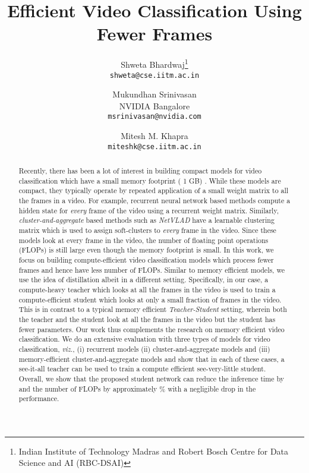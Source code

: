 \documentclass[10pt,twocolumn,letterpaper]{article}
\begin{document}
\title{Efficient Video Classification Using Fewer Frames}
\newcommand*\samethanks[1][\value{footnote}]{\footnotemark[#1]}
\author{Shweta Bhardwaj\thanks{Indian Institute of Technology Madras and Robert Bosch Centre for Data Science and AI (RBC-DSAI)}\\  {\tt\small shweta@cse.iitm.ac.in} 
        \and
        Mukundhan Srinivasan \\ \small{NVIDIA Bangalore} \\ {\tt\small msrinivasan@nvidia.com} \\
        \and
        Mitesh M. Khapra\samethanks\\  
        {\tt\small miteshk@cse.iitm.ac.in}
}





\maketitle


\begin{abstract}
Recently, there has been a lot of interest in building compact models for video classification which have a small memory footprint ( 1 GB) \cite{summary-paper}. While these models are compact, they typically operate by repeated application of a small weight matrix to all the frames in a video. For example, recurrent neural network based methods compute a hidden state for \textit{every} frame of the video using a recurrent weight matrix. Similarly, \textit{cluster-and-aggregate} based methods such as \textit{NetVLAD} have a learnable clustering matrix which is used to assign soft-clusters to \textit{every} frame in the video. Since these models look at every frame in the video, the number of floating point operations (FLOPs) is still large even though the memory footprint is small. In this work, we focus on building compute-efficient video classification models which process fewer frames and hence have less number of FLOPs. Similar to memory efficient models, we use the idea of distillation albeit in a different setting. Specifically, in our case, a compute-heavy teacher which looks at all the frames in the video is used to train a compute-efficient student which looks at only a small fraction of frames in the video. This is in contrast to a typical memory efficient \textit{Teacher-Student} setting, wherein both the teacher and the student look at all the frames in the video but the student has fewer parameters. Our work thus complements the research on memory efficient video classification. We do an extensive evaluation with three types of models for video classification, \textit{viz.}, (i) recurrent models (ii) cluster-and-aggregate models and (iii) memory-efficient cluster-and-aggregate models and show that in each of these cases, a see-it-all teacher can be used to train a compute efficient see-very-little student. Overall, we show that the proposed student network can reduce the inference time by  and the number of FLOPs by approximately \% with a negligible drop in the performance. 

\end{abstract}
\end{document}
